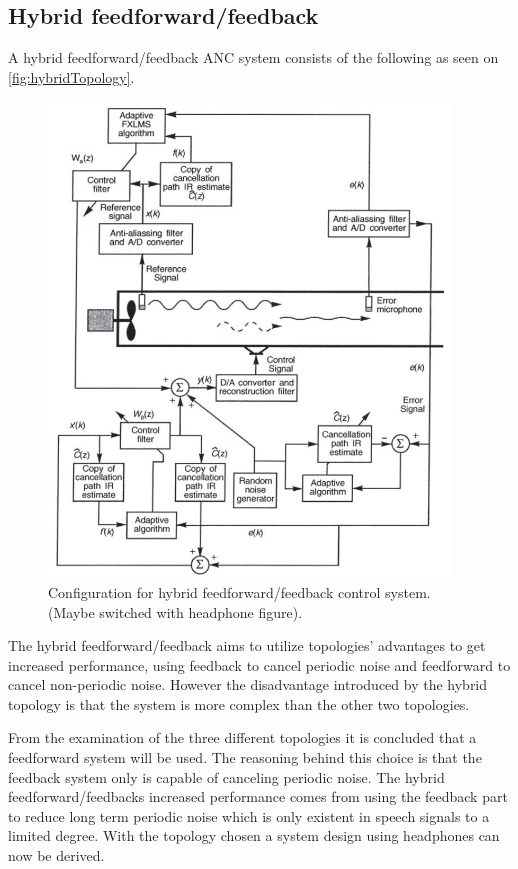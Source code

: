 \subsection*{Hybrid feedforward/feedback}    
A hybrid feedforward/feedback ANC system consists of the following as seen on \autoref{fig:hybridTopology}.
\begin{figure}[H]
	\centering
	\includegraphics[width=0.95\textwidth]{figures/BasicSystem/hybrid}
	\caption{Configuration for hybrid feedforward/feedback control system. (Maybe switched with headphone figure).}
	\label{fig:hybridTopology}
\end{figure}

The hybrid feedforward/feedback aims to utilize topologies' advantages to get increased performance, using feedback to cancel periodic noise and feedforward to cancel non-periodic noise. However the disadvantage introduced by the hybrid topology is that the system is more complex than the other two topologies.   


From the examination of the three different topologies it is concluded that a feedforward system will be used. The reasoning behind this choice is that the feedback system only is capable of canceling periodic noise. The hybrid feedforward/feedbacks increased performance comes from using the feedback part to reduce long term periodic noise which is only existent in speech signals to a limited degree. With the topology chosen a system design using headphones can now be derived. 
